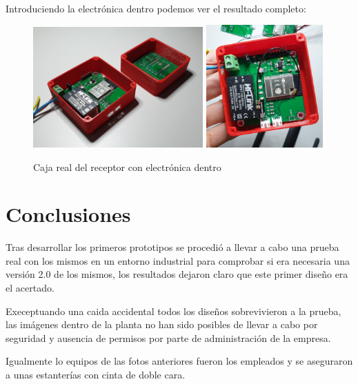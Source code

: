 \documentclass[a4paper ,12pt, onecolumn]{article}
\begin{document}
        \paragraph{}
        Introduciendo la electrónica dentro podemos ver el resultado completo:
        \begin{center}
            \begin{figure}[h]
                \centering
                \includegraphics[width=0.58\textwidth]{../3d_master_2_box.jpeg}
                \includegraphics[width=0.4\textwidth]{../3d_antenna.jpeg}
                \caption{Caja real del receptor con electrónica dentro}
                \label{fig:mesh1}
            \end{figure}    
        \end{center}
\section{Conclusiones}
    Tras desarrollar los primeros prototipos se procedió a llevar a cabo una prueba real con los mismos 
    en un entorno industrial para comprobar si era necesaria una versión 2.0 de los mismos, los resultados
    dejaron claro que este primer diseño era el acertado.

    Execeptuando una caida accidental todos los diseños sobrevivieron a la prueba, las imágenes dentro de la planta
    no han sido posibles de llevar a cabo por seguridad y ausencia de permisos por parte de administración de la empresa.

    Igualmente lo equipos de las fotos anteriores fueron los empleados y se aseguraron a unas estanterías con cinta de doble cara.
\end{document}

